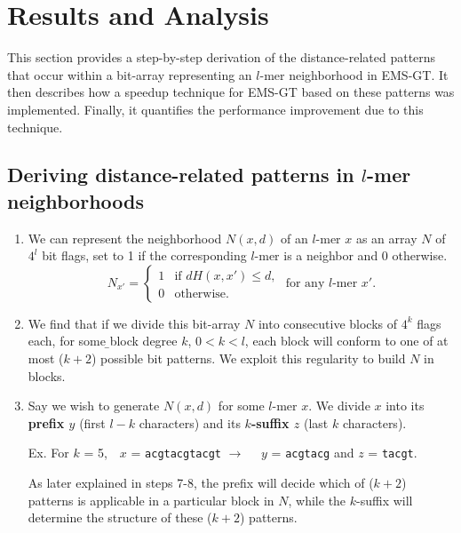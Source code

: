 \documentclass[oneside,12pt]{DISCSthesis}
\begin{document}
{\chapter{Results and Analysis}
	This section provides a step-by-step derivation of the distance-related patterns that occur within a bit-array representing an $l$-mer neighborhood in EMS-GT. It then describes how a speedup technique for EMS-GT based on these patterns was implemented. Finally, it quantifies the performance improvement due to this technique.
	
	\section{\boldmath Deriving distance-related patterns in $l$-mer neighborhoods}
		\begin{enumerate}
			\item We can represent the neighborhood $N(x,d)$ of an $l$-mer $x$ as an array $N$ of $4^{l}$ bit flags, set to 1 if the corresponding $l$-mer is a neighbor and 0 otherwise.
				\begin{equation}
					N_{x'} = \left\{
					\begin{array}{rl}
						1 & \text{if } dH(x,x') \leq d,\\
						0 & \text{otherwise.}%
					\end{array} \right.
					\text{ for any $l$-mer }x'.
					\end{equation}

			\item We find that if we divide this bit-array $N$ into consecutive blocks of $4^{k}$ flags each, for some {\b\boldmath block degree $k$}, $0 < k < l$, each block will conform to one of at most ($k + 2$) possible bit patterns. We exploit this regularity to build $N$ in blocks.

			\item Say we wish to generate $N(x,d)$ for some $l$-mer $x$. We divide $x$ into its {\bf\boldmath prefix $y$ }(first $l - k$ characters) and its {\bf\boldmath $k$-suffix $z$} (last $k$ characters).

				{\small\hspace*{40pt}Ex. For $k$ = 5,\ \ $x$ = \texttt{acgtacgtacgt} $\rightarrow$ \ \ $y$ = \texttt{acgtacg} and $z$ = \texttt{tacgt}.}

			As later explained in steps 7-8, the prefix will decide which of ($k + 2$) patterns is applicable in a particular block in $N$, while the $k$-suffix will determine the structure of these ($k + 2$) patterns.


\end{enumerate}}
\end{document}
